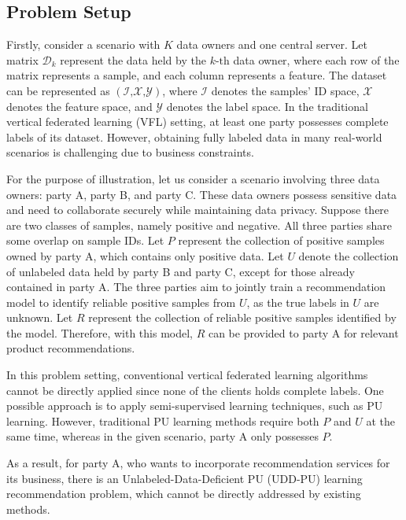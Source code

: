 \documentclass[10pt,journal,compsoc]{IEEEtran}
\begin{document}
\subsection{Problem Setup}
Firstly, consider a scenario with $K$ data owners and one central server. Let matrix ${{\mathsf{\mathcal{D}}}_{k}}$ represent the data held by the $k\text{-th}$ data owner, where each row of the matrix represents a sample, and each column represents a feature. The dataset can be represented as $(\mathsf{\mathcal{I}}\text{,}\mathsf{\mathcal{X}}\text{,}\mathsf{\mathcal{Y}})$, where $\mathsf{\mathcal{I}}$  denotes the samples' ID space, $\mathsf{\mathcal{X}} $ denotes the feature space, and $\mathsf{\mathcal{Y}}$ denotes the label space. In the traditional vertical federated learning (VFL) setting, at least one party possesses complete labels of its dataset. However, obtaining fully labeled data in many real-world scenarios is challenging due to business constraints.

For the purpose of illustration, let us consider a scenario involving three data owners: party A, party B, and party C. These data owners possess sensitive data and need to collaborate securely while maintaining data privacy. Suppose there are two classes of samples, namely positive and negative. All three parties share some overlap on sample IDs. Let $P$  represent the collection of positive samples owned by party A, which contains only positive data. Let $U$  denote the collection of unlabeled data held by party B and party C, except for those already contained in party A. The three parties aim to jointly train a recommendation model to identify reliable positive samples from $U$, as the true labels in $U$  are unknown. Let $R$  represent the collection of reliable positive samples identified by the model. Therefore, with this model, $R$ can be provided to party A for relevant product recommendations. 

In this problem setting, conventional vertical federated learning algorithms cannot be directly applied since none of the clients holds complete labels. One possible approach is to apply semi-supervised learning techniques, such as PU learning. However, traditional PU learning methods require both $P$  and  $U$ at the same time, whereas in the given scenario, party A only possesses $P$. 

As a result, for party A, who wants to incorporate recommendation services for its business, there is an Unlabeled-Data-Deficient PU (UDD-PU) learning recommendation problem, which cannot be directly addressed by existing methods. 
\end{document}
